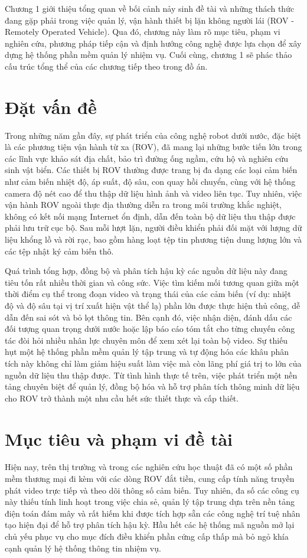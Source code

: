 \documentclass[../DoAn.tex]{subfiles}
\begin{document}
Chương 1 giới thiệu tổng quan về bối cảnh nảy sinh đề tài và những thách thức đang gặp phải trong việc quản lý, vận hành thiết bị lặn không người lái (ROV - Remotely Operated Vehicle). Qua đó, chương này làm rõ mục tiêu, phạm vi nghiên cứu, phương pháp tiếp cận và định hướng công nghệ được lựa chọn để xây dựng hệ thống phần mềm quản lý nhiệm vụ. Cuối cùng, chương 1 sẽ phác thảo cấu trúc tổng thể của các chương tiếp theo trong đồ án.

\section{Đặt vấn đề}
\label{section:1.1}
Trong những năm gần đây, sự phát triển của công nghệ robot dưới nước, đặc biệt là các phương tiện vận hành từ xa (ROV), đã mang lại những bước tiến lớn trong các lĩnh vực khảo sát địa chất, bảo trì đường ống ngầm, cứu hộ và nghiên cứu sinh vật biển. Các thiết bị ROV thường được trang bị đa dạng các loại cảm biến như cảm biến nhiệt độ, áp suất, độ sâu, con quay hồi chuyển, cùng với hệ thống camera độ nét cao để thu thập dữ liệu hình ảnh và video liên tục. Tuy nhiên, việc vận hành ROV ngoài thực địa thường diễn ra trong môi trường khắc nghiệt, không có kết nối mạng Internet ổn định, dẫn đến toàn bộ dữ liệu thu thập được phải lưu trữ cục bộ. Sau mỗi lượt lặn, người điều khiển phải đối mặt với lượng dữ liệu khổng lồ và rời rạc, bao gồm hàng loạt tệp tin phương tiện dung lượng lớn và các tệp nhật ký cảm biến thô.

Quá trình tổng hợp, đồng bộ và phân tích hậu kỳ các nguồn dữ liệu này đang tiêu tốn rất nhiều thời gian và công sức. Việc tìm kiếm mối tương quan giữa một thời điểm cụ thể trong đoạn video và trạng thái của các cảm biến (ví dụ: nhiệt độ và độ sâu tại vị trí xuất hiện vật thể lạ) phần lớn được thực hiện thủ công, dễ dẫn đến sai sót và bỏ lọt thông tin. Bên cạnh đó, việc nhận diện, đánh dấu các đối tượng quan trọng dưới nước hoặc lập báo cáo tóm tắt cho từng chuyến công tác đòi hỏi nhiều nhân lực chuyên môn để xem xét lại toàn bộ video. Sự thiếu hụt một hệ thống phần mềm quản lý tập trung và tự động hóa các khâu phân tích này không chỉ làm giảm hiệu suất làm việc mà còn lãng phí giá trị to lớn của nguồn dữ liệu thu thập được. Từ tình hình thực tế trên, việc phát triển một nền tảng chuyên biệt để quản lý, đồng bộ hóa và hỗ trợ phân tích thông minh dữ liệu cho ROV trở thành một nhu cầu hết sức thiết thực và cấp thiết.

\section{Mục tiêu và phạm vi đề tài}
\label{section:1.2}
Hiện nay, trên thị trường và trong các nghiên cứu học thuật đã có một số phần mềm thương mại đi kèm với các dòng ROV đắt tiền, cung cấp tính năng truyền phát video trực tiếp và theo dõi thông số cảm biến. Tuy nhiên, đa số các công cụ này thiếu tính linh hoạt trong việc chia sẻ, quản lý tập trung dựa trên nền tảng điện toán đám mây và rất hiếm khi được tích hợp sẵn các công nghệ trí tuệ nhân tạo hiện đại để hỗ trợ phân tích hậu kỳ. Hầu hết các hệ thống mã nguồn mở lại chủ yếu phục vụ cho mục đích điều khiển phần cứng cấp thấp mà bỏ ngỏ khía cạnh quản lý hệ thống thông tin nhiệm vụ.
\end{document}

